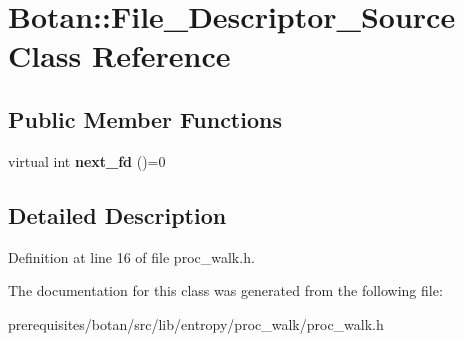 \hypertarget{class_botan_1_1_file___descriptor___source}{}\section{Botan\+:\+:File\+\_\+\+Descriptor\+\_\+\+Source Class Reference}
\label{class_botan_1_1_file___descriptor___source}
\subsection*{Public Member Functions}
\begin{DoxyCompactItemize}
\item 
\mbox{\label{class_botan_1_1_file___descriptor___source_ae9fcacfd13dc5284baae43896a2bcf37}} 
virtual int {\bfseries next\+\_\+fd} ()=0
\end{DoxyCompactItemize}


\subsection{Detailed Description}


Definition at line 16 of file proc\+\_\+walk.\+h.



The documentation for this class was generated from the following file\+:\begin{DoxyCompactItemize}
\item 
prerequisites/botan/src/lib/entropy/proc\+\_\+walk/proc\+\_\+walk.\+h\end{DoxyCompactItemize}

